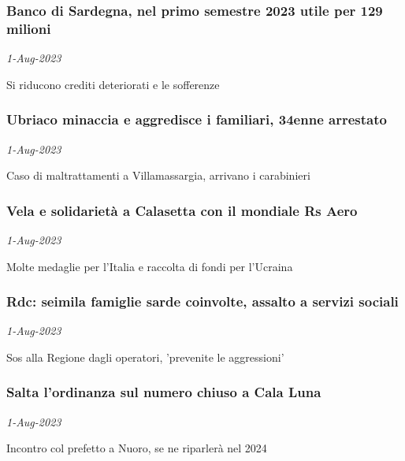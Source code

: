 \subsubsection{Banco di Sardegna, nel primo semestre 2023 utile per 129 milioni \href{https://www.ansa.it/sardegna/notizie/2023/08/01/banco-di-sardegna-nel-primo-semestre-2023-utile-per-129-milioni_d26c1941-b3f9-4d21-a76d-912d9f359bd3.html}{}}
\textit{1-Aug-2023}

Si riducono crediti deteriorati e le sofferenze
\subsubsection{Ubriaco minaccia e aggredisce i familiari, 34enne arrestato \href{https://www.ansa.it/sardegna/notizie/2023/08/01/ubriaco-minaccia-e-aggredisce-i-familiari-34enne-arrestato_6c1d1489-4011-4880-a194-31e8af6af26f.html}{}}
\textit{1-Aug-2023}

Caso di maltrattamenti a Villamassargia, arrivano i carabinieri
\subsubsection{Vela e solidariet\`{a} a Calasetta con il mondiale Rs Aero \href{https://www.ansa.it/sardegna/notizie/2023/08/01/vela-e-solidarieta-a-calasetta-con-il-mondiale-rs-aero_d874d50b-7c6b-4d5f-abcf-347d44999a26.html}{}}
\textit{1-Aug-2023}

Molte medaglie per l'Italia e raccolta di fondi per l'Ucraina
\subsubsection{Rdc: seimila famiglie sarde coinvolte, assalto a servizi sociali \href{https://www.ansa.it/sardegna/notizie/2023/08/01/rdc-seimila-famiglie-sarde-coinvolte-assalto-a-servizi-sociali_4ec5c6f2-ab05-419d-a743-1aa0c77437e1.html}{}}
\textit{1-Aug-2023}

Sos alla Regione dagli operatori, 'prevenite le aggressioni'
\subsubsection{Salta l'ordinanza sul numero chiuso a Cala Luna \href{https://www.ansa.it/sardegna/notizie/2023/08/01/salta-ordinanza-sul-numero-chiuso-a-cala-luna-sara-dal-2024_45f954f2-f5b5-4fe2-8303-e48a983213c3.html}{}}
\textit{1-Aug-2023}

Incontro col prefetto a Nuoro, se ne riparler\`{a} nel 2024

